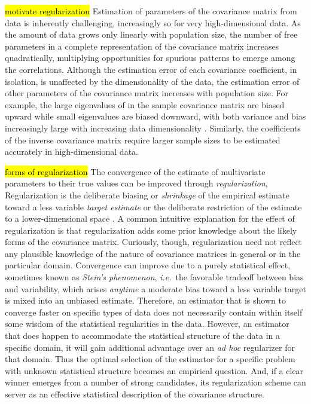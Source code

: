 \hl{\tiny motivate regularization} Estimation of parameters of the covariance matrix from data is inherently challenging, increasingly so for very high-dimensional data. As the amount of data grows only linearly with population size, the number of free parameters in a complete representation of the covariance matrix increases quadratically, multiplying opportunities for spurious patterns to emerge among the correlations.  Although the estimation error of each covariance coefficient, in isolation, is unaffected by the dimensionality of the data, the estimation error of other parameters of the covariance matrix increases with population size.  
For example, the large eigenvalues of in the sample covariance matrix are biased upward while small eigenvalues are biased downward, with both variance and bias increasingly large with increasing data dimensionality \citep{Hayes:1981}.  Similarly, the coefficients of the inverse covariance matrix require larger sample sizes to be estimated accurately in high-dimensional data.

\hl{\tiny forms of regularization} The convergence of the estimate of multivariate parameters to their true values can be improved through \emph{regularization},  Regularization is the deliberate biasing or \emph{shrinkage} of the empirical estimate toward a less variable \emph{target estimate} \citep{Schafer:2005} or the deliberate restriction of the estimate to a lower-dimensional space \citep{Dempster:1972,Fan:2008,Friedman:2008,Rothman:2008}.  A common intuitive explanation for the effect of regularization is that regularization adds some prior knowledge about the likely forms of the covariance matrix. Curiously, though, regularization need not reflect any plausible knowledge of the nature of covariance matrices in general or in the particular domain. Convergence can improve due to a purely statistical effect, sometimes known as \emph{Stein's phenomenon}, \emph{i.e.}~the favorable tradeoff between bias and variability, which arises \emph{anytime} a moderate bias toward a less variable target is mixed into an unbiased estimate.  Therefore, an estimator that is shown to converge faster on specific types of data does not necessarily contain within itself some wisdom of the statistical regularities in the data.  However, an estimator that does happen to accommodate the statistical structure of the data in a specific domain, it will gain additional advantage over an \emph{ad hoc} regularizer for that domain. Thus the optimal selection of the estimator for a specific problem with unknown statistical structure becomes an empirical question. And, if a clear winner emerges from a number of strong candidates, its regularization scheme can server as an effective statistical description of the covariance structure. 

